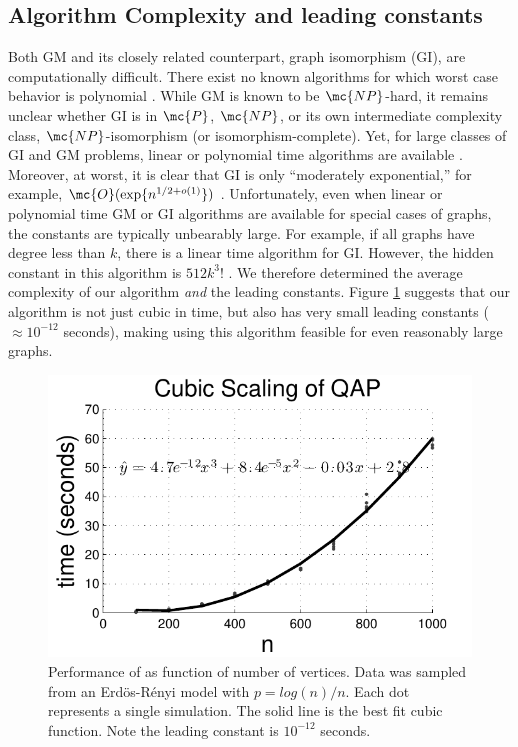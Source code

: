 \documentclass[10pt,journal,cspaper,compsoc]{IEEEtran}
\begin{document}


\subsection{Algorithm Complexity and leading constants} %
\label{sub:algorithm_complexity_and_leading_constants}

Both GM and its closely related counterpart, graph isomorphism (GI), are computationally difficult.  There exist no known algorithms for which worst case behavior is polynomial \cite{Fortin1996}.  While GM is known to be $\mc{NP}$-hard, it remains unclear whether GI is in $\mc{P}$, $\mc{NP}$, or its own intermediate complexity class, $\mc{NP}$-isomorphism (or isomorphism-complete).  Yet, for large classes of GI and GM problems, linear or polynomial time algorithms are available \cite{Babai1980}.  Moreover, at worst, it is clear that GI is only ``moderately exponential,'' for example, $\mc{O}(\exp\{n^{1/2 + o(1)}\})$ \cite{Babai1981}.  Unfortunately, even when linear or polynomial time GM or GI algorithms are available for special cases of graphs, the constants are typically unbearably large.  For example, if all graphs have degree less than $k$, there is a linear time algorithm for GI.  However, the hidden constant in this algorithm is $512k^3!$ \cite{Chen1994}.  We therefore determined the average complexity of our algorithm \emph{and} the leading constants.  Figure \ref{fig:scaling} suggests that our algorithm is not just cubic in time, but also has very small leading constants ($\approx 10^{-12}$ seconds), making using this algorithm feasible for even reasonably large graphs.




\begin{figure}[htbp]
	\centering			
	\includegraphics[width=1.0\linewidth]{../figs/digraph_qap2}
	\caption{Performance of \qap as function of number of vertices. Data was sampled from an Erd\"os-R\'enyi model with $p=log(n)/n$.  Each dot represents a single simulation.  The solid line is the best fit cubic function.  Note the leading constant is $10^{-12}$ seconds. }
	\label{fig:scaling}
\end{figure}
\end{document}
